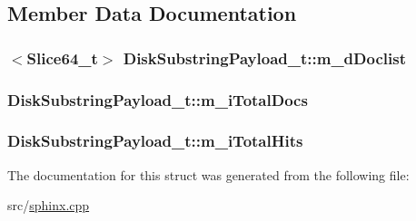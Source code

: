 \subsection{Member Data Documentation}
\hypertarget{structDiskSubstringPayload__t_ade8971ccb624c135456aa6b28f0b7abc}{
\subsubsection[{m\-\_\-d\-Doclist}]{$<${\bf Slice64\-\_\-t}$>$ Disk\-Substring\-Payload\-\_\-t\-::m\-\_\-d\-Doclist}}\label{structDiskSubstringPayload__t_ade8971ccb624c135456aa6b28f0b7abc}
\hypertarget{structDiskSubstringPayload__t_acdfbb4785f5ff30015ec1a79710c37df}{
\subsubsection[{m\-\_\-i\-Total\-Docs}]{ Disk\-Substring\-Payload\-\_\-t\-::m\-\_\-i\-Total\-Docs}}\label{structDiskSubstringPayload__t_acdfbb4785f5ff30015ec1a79710c37df}
\hypertarget{structDiskSubstringPayload__t_a33a5de4908cb1bd41a80ae0c69eed694}{
\subsubsection[{m\-\_\-i\-Total\-Hits}]{ Disk\-Substring\-Payload\-\_\-t\-::m\-\_\-i\-Total\-Hits}}\label{structDiskSubstringPayload__t_a33a5de4908cb1bd41a80ae0c69eed694}


The documentation for this struct was generated from the following file\-:\begin{DoxyCompactItemize}
\item 
src/\hyperlink{sphinx_8cpp}{sphinx.\-cpp}\end{DoxyCompactItemize}
